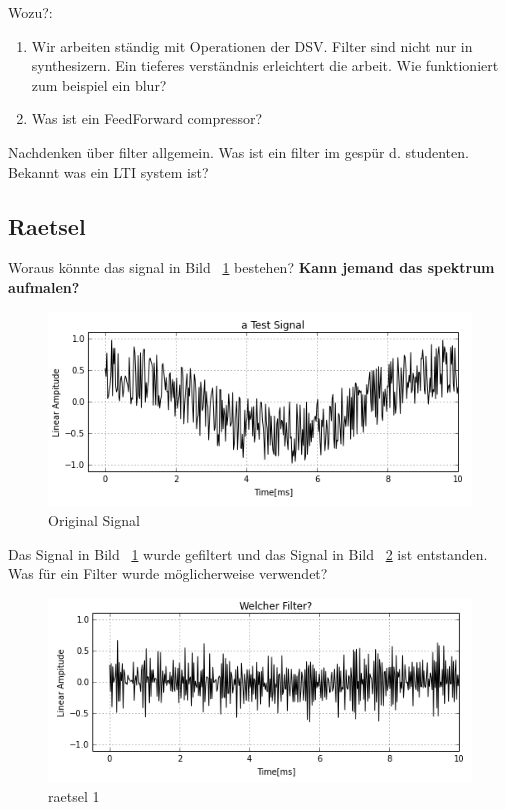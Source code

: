 Wozu?:\\
\begin{enumerate}
	\item Wir arbeiten ständig mit Operationen der DSV. Filter sind nicht nur in synthesizern. Ein tieferes verständnis erleichtert die arbeit. Wie funktioniert zum beispiel ein blur?
	\item Was ist ein FeedForward compressor?
\end{enumerate}


Nachdenken über filter allgemein. Was ist ein filter im gespür d. studenten. \\
Bekannt was ein LTI system ist?\\

\subsection{Raetsel} %
\label{sub:raetsel}

Woraus könnte das signal in Bild ~\ref{fig:originalSignal} bestehen?
\textbf{Kann jemand das spektrum aufmalen?}
\begin{figure}[H]
	\begin{center}
		\includegraphics[width = 14cm]{raetsel_original.png}
		\caption{Original Signal}
		\label{fig:originalSignal}
	\end{center}
\end{figure}

Das Signal in Bild ~\ref{fig:originalSignal} wurde gefiltert und das Signal in Bild ~\ref{fig:raetsel_1} ist entstanden. Was für ein Filter wurde möglicherweise verwendet?

\begin{figure}[H]
	\begin{center}
		\includegraphics[width = 14cm]{raetsel_highpass.png}
		\caption{raetsel 1}
		\label{fig:raetsel_1}
	\end{center}
\end{figure}

